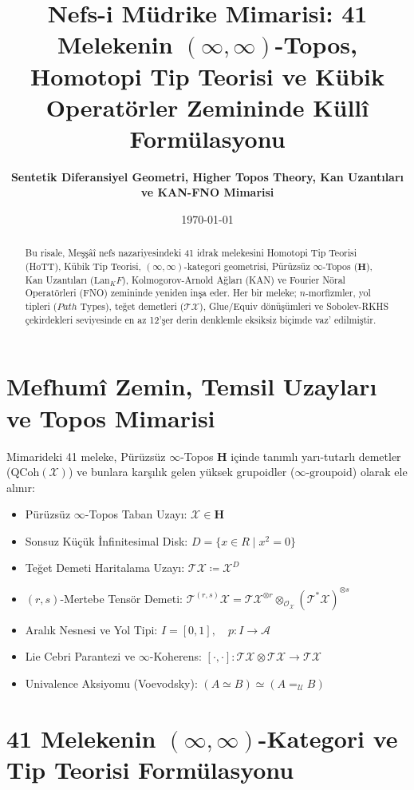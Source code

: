 \documentclass[11pt, a4paper]{article}
\title{\textbf{Nefs-i Müdrike Mimarisi: 41 Melekenin $(\infty, \infty)$-Topos, Homotopi Tip Teorisi ve Kübik Operatörler Zemininde Küllî Formülasyonu}}
\author{\textbf{Sentetik Diferansiyel Geometri, Higher Topos Theory, Kan Uzantıları ve KAN-FNO Mimarisi}}
\date{\today}
\begin{document}
\maketitle

\begin{abstract}
Bu risale, Meşşâî nefs nazariyesindeki 41 idrak melekesini Homotopi Tip Teorisi (HoTT), Kübik Tip Teorisi, $(\infty, \infty)$-kategori geometrisi, Pürüzsüz $\infty$-Topos ($\mathbf{H}$), Kan Uzantıları ($\text{Lan}_K F$), Kolmogorov-Arnold Ağları (KAN) ve Fourier Nöral Operatörleri (FNO) zemininde yeniden inşa eder. Her bir meleke; $n$-morfizmler, yol tipleri ($Path\text{ Types}$), teğet demetleri ($\mathcal{T}\mathcal{X}$), Glue/Equiv dönüşümleri ve Sobolev-RKHS çekirdekleri seviyesinde en az 12'şer derin denklemle eksiksiz biçimde vaz' edilmiştir.
\end{abstract}

\section{Mefhumî Zemin, Temsil Uzayları ve Topos Mimarisi}

Mimarideki 41 meleke, Pürüzsüz $\infty$-Topos $\mathbf{H}$ içinde tanımlı yarı-tutarlı demetler ($\text{QCoh}(\mathcal{X})$) ve bunlara karşılık gelen yüksek grupoidler ($\infty\text{-groupoid}$) olarak ele alınır:
\begin{itemize}
    \item Pürüzsüz $\infty$-Topos Taban Uzayı: $\mathcal{X} \in \mathbf{H}$
    \item Sonsuz Küçük İnfinitesimal Disk: $D = \{x \in R \mid x^2 = 0\}$
    \item Teğet Demeti Haritalama Uzayı: $\mathcal{T}\mathcal{X} \coloneqq \mathcal{X}^D$
    \item $(r, s)$-Mertebe Tensör Demeti: $\mathcal{T}^{(r, s)}\mathcal{X} = \mathcal{T}\mathcal{X}^{\otimes r} \otimes_{\mathcal{O}_{\mathcal{X}}} (\mathcal{T}^*\mathcal{X})^{\otimes s}$
    \item Aralık Nesnesi ve Yol Tipi: $I = [0, 1], \quad p : I \to \mathcal{A}$
    \item Lie Cebri Parantezi ve $\infty$-Koherens: $[\cdot, \cdot] : \mathcal{T}\mathcal{X} \otimes \mathcal{T}\mathcal{X} \to \mathcal{T}\mathcal{X}$
    \item Univalence Aksiyomu (Voevodsky): $(A \simeq B) \simeq (A =_{\mathcal{U}} B)$
\end{itemize}

\section{41 Melekenin $(\infty, \infty)$-Kategori ve Tip Teorisi Formülasyonu}
\end{document}
